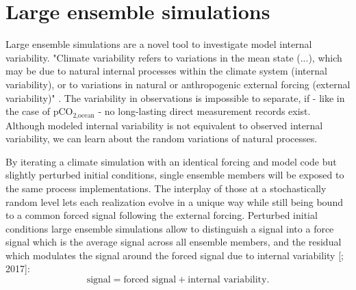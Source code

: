 


\section{Large ensemble simulations}
\label{sec:PICLE}
Large ensemble simulations are a novel tool to investigate model internal variability. "Climate variability refers to variations in the mean state (...), which may be due to natural internal processes within the climate system (internal variability), or to variations in natural or anthropogenic external forcing (external variability)" \citep{IPCC}. The variability in observations is impossible to separate, if - like in the case of pCO$_{\text{2,ocean}}$ - no long-lasting direct measurement records exist.
Although modeled internal variability is not equivalent to observed internal variability, we can learn about the random variations of natural processes.

By iterating a climate simulation with an identical forcing and model code but slightly perturbed initial conditions, single ensemble members will be exposed to the same process implementations. The interplay of those at a stochastically random level lets each realization evolve in a unique way while still being bound to a common forced signal following the external forcing. Perturbed initial conditions large ensemble simulations allow to distinguish a signal into a force signal which is the average signal across all ensemble members, and the residual which modulates the signal around the forced signal due to internal variability [\cite{McKinley2016}; {\color{RoyalBlue}2017}]: 
\[ \text{signal}=\text{forced signal}+\text{internal variability}.\]

